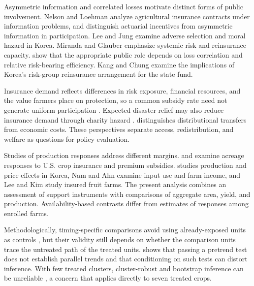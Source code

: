 Asymmetric information and correlated losses motivate distinct forms of public involvement. Nelson and Loehman \citeyearpar{nelson1987} analyze agricultural insurance contracts under information problems, and \citet{just1999} distinguish actuarial incentives from asymmetric information in participation. Lee and Jung \citeyearpar{leejung2014} examine adverse selection and moral hazard in Korea. Miranda and Glauber \citeyearpar{miranda1997} emphasize systemic risk and reinsurance capacity. \citet{jia2025} show that the appropriate public role depends on loss correlation and relative risk-bearing efficiency. Kang and Chung \citeyearpar{kang2017} examine the implications of Korea's risk-group reinsurance arrangement for the state fund.

Insurance demand reflects differences in risk exposure, financial resources, and the value farmers place on protection, so a common subsidy rate need not generate uniform participation \citep{hazell2017}. Expected disaster relief may also reduce insurance demand through charity hazard \citep{coate1995,raschky2007}. \citet{lusk2017} distinguishes distributional transfers from economic costs. These perspectives separate access, redistribution, and welfare as questions for policy evaluation.

Studies of production responses address different margins. \citet{goodwin2004} and \citet{yu2018} examine acreage responses to U.S. crop insurance and premium subsidies. \citet{han2014} studies production and price effects in Korea, Nam and Ahn \citeyearpar{nam2022} examine input use and farm income, and Lee and Kim \citeyearpar{leekim2026} study insured fruit farms. The present analysis combines an assessment of support instruments with comparisons of aggregate area, yield, and production. Availability-based contrasts differ from estimates of responses among enrolled farms.

Methodologically, timing-specific comparisons avoid using already-exposed units as controls \citep{callaway2021}, but their validity still depends on whether the comparison units trace the untreated path of the treated units. \citet{roth2022} shows that passing a pretrend test does not establish parallel trends and that conditioning on such tests can distort inference. With few treated clusters, cluster-robust and bootstrap inference can be unreliable \citep{cameron2008,mackinnonwebb2018,mackinnon2023,webb2023}, a concern that applies directly to seven treated crops.
